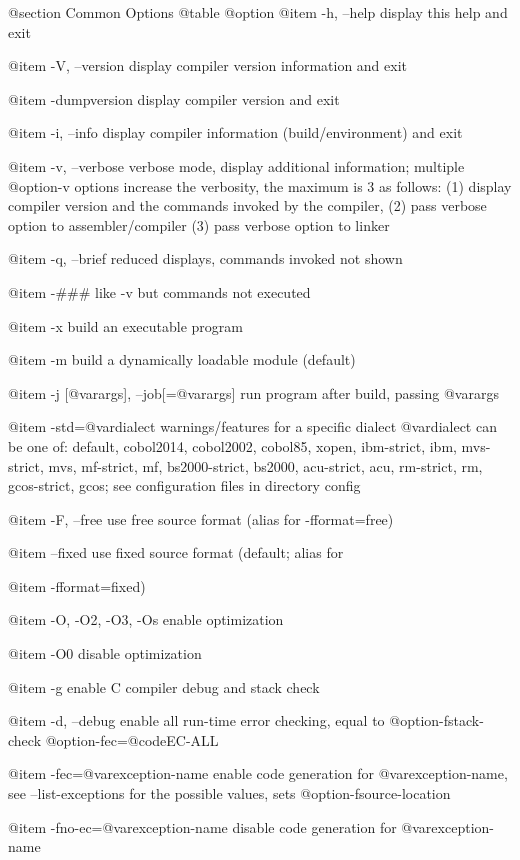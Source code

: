 @section Common Options
@table @option
@item -h, --help
display this help and exit

@item -V, --version
display compiler version information and exit

@item -dumpversion
display compiler version and exit

@item -i, --info
display compiler information (build/environment)
and exit

@item -v, --verbose
verbose mode, display additional information;
multiple @option{-v} options increase the verbosity,
the maximum is 3 as follows:
(1) display compiler version and the commands
invoked by the compiler,
(2) pass verbose option to assembler/compiler
(3) pass verbose option to linker

@item -q, --brief
reduced displays, commands invoked not shown

@item -###
like -v but commands not executed

@item -x
build an executable program

@item -m
build a dynamically loadable module (default)

@item -j [@var{args}], --job[=@var{args}]
run program after build, passing @var{args}

@item -std=@var{dialect}
warnings/features for a specific dialect
@var{dialect} can be one of:
default, cobol2014, cobol2002, cobol85, xopen,
ibm-strict, ibm, mvs-strict, mvs,
mf-strict, mf, bs2000-strict, bs2000,
acu-strict, acu, rm-strict, rm, gcos-strict,
gcos;
see configuration files in directory config

@item -F, --free
use free source format (alias for -fformat=free)

@item --fixed
use fixed source format (default; alias for

@item -fformat=fixed)

@item -O, -O2, -O3, -Os
enable optimization

@item -O0
disable optimization

@item -g
enable C compiler debug and stack check

@item -d, --debug
enable all run-time error checking,
equal to @option{-fstack-check} @option{-fec=}@code{EC-ALL}

@item -fec=@var{exception-name}
enable code generation for @var{exception-name},
see --list-exceptions for the possible values,
sets @option{-fsource-location}

@item -fno-ec=@var{exception-name}
disable code generation for @var{exception-name}

